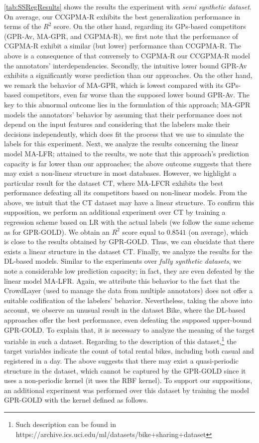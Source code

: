 \documentclass[9pt]{article}
\begin{document}
\cref{tab:SSRegResults} shows the results the experiment with \textit{semi synthetic dataset}. On average, our CCGPMA-R  exhibits the best generalization performance in terms of the $R^2$ score. On the other hand, regarding its GPs-based competitors (GPR-Av, MA-GPR, and CGPMA-R), we first note that the performance of CGPMA-R exhibit a similar (but lower) performance than CCGPMA-R. The above is a consequence of that conversely to CGPMA-R our CCGPMA-R model the annotators' interdependencies. Secondly, the intuitive lower bound GPR-Av exhibits a significantly worse prediction than our approaches. On the other hand, we remark the behavior of MA-GPR, which is lowest compared with its GPs-based competitors, even far worse than the supposed lower bound GPR-Av. The key to this abnormal outcome lies in the formulation of this approach; MA-GPR models the annotators' behavior by assuming that their performance does not depend on the input features and considering that the labelers make their decisions independently, which does fit the process that we use to simulate the labels for this experiment.
Next, we analyze the results concerning the linear model MA-LFR; attained to the results, we note that this approach's prediction capacity is far lower than our approaches; the above outcome suggests that there may exist a non-linear structure in most databases. However, we highlight a particular result for the dataset CT, where MA-LFCR exhibits the best performance defeating all its competitors based on non-linear models. From the above, we intuit that the CT dataset may have a linear structure. To confirm this supposition, we perform an additional experiment over CT by training a regression scheme based on LR with the actual labels (we follow the same scheme as for GPR-GOLD). We obtain an $R^2$ score equal to $0.8541$ (on average), which is close to the results obtained by GPR-GOLD. Thus, we can elucidate that there exists a linear structure in the dataset CT. Finally, we analyze the results for the DL-based models. Similar to the experiments over \textit{fully synthetic datasets}, we note a considerable low prediction capacity; in fact, they are even defeated by the linear model MA-LFR. Again, we attribute this behavior to the fact that the CrowdLayer (used to manage the data from multiple annotators) does not offer a suitable codification of the labelers' behavior. Nevertheless, taking the above into account, we observe an unusual result in the dataset Bike, where the DL-based approaches offer the best performance, even defeating the supposed upper-bound GPR-GOLD. To explain that, it is necessary to analyze the meaning of the target variable in such a dataset. Regarding to the description of this dataset,\footnote{Such description can be found in https://archive.ics.uci.edu/ml/datasets/bike+sharing+dataset} the target variables indicate the count of total rental bikes, including both casual and registered in a day. The above suggests that there may exist a quasi-periodic structure in the dataset, which cannot be captured by the GPR-GOLD since it uses a non-periodic kernel (it uses the RBF kernel). To support our suppositions, an additional experiment was performed over this dataset by training the model GPR-GOLD with the kernel defined as follows. 
\end{document}
